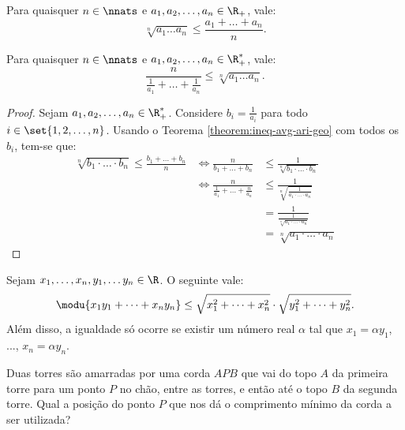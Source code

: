 \begin{theorem}
\label{theorem:ineq-avg-ari-geo}
Para quaisquer $n \in \nnats$ e $a_1, a_2, \dots , a_n \in \R_+$, vale:
%
\begin{equation*}
    \sqrt[n]{a_1\dots a_n} \leq \frac {a_1 + \dots + a_n} n.
\end{equation*}
\end{theorem}

\begin{theorem}
Para quaisquer $n \in \nnats$ e $a_1, a_2, \dots , a_n \in \R_+^*$, vale:
%
\begin{equation*}
    \frac n {\frac 1 {a_1} + \dots + \frac 1 {a_n}}  \leq \sqrt[n]{a_1\dots a_n}  .
\end{equation*}
\end{theorem}

\begin{proof}
Sejam $a_1, a_2, \dots, a_n \in \R_+ ^*$. Considere $b_i = \frac 1 {a_i}$ para todo $i \in \set{1, 2, \dots, n}$. Usando o Teorema \ref{theorem:ineq-avg-ari-geo} com todos os $b_i$, tem-se que:
%
\begin{eqnarray*}
\sqrt[n]{b_1 \cdot \dots \cdot b_n } \le \frac {b_1 + \dots + b_n } n & \iff \frac n {b_1 + \dots + b_n } & \le \frac 1 {\sqrt[n]{b_1 \cdot \dots \cdot b_n }} \\
& \iff \frac n {\frac 1 {a_1} + \dots + \frac n {a_n}} & \le \frac 1 {\sqrt[n]{\frac 1 {a_1 \cdot \dots \cdot a_n}}} \\ 
& & = \frac 1 {\frac 1 {\sqrt[n]{a_1 \cdot \dots \cdot a_n}}} \\ 
& & =  \sqrt[n]{a_1 \cdot \dots \cdot a_n}
\end{eqnarray*}
\end{proof}

\begin{theorem}
Sejam $x_1, \dots , x_n, y_1, \dots y_n \in \R$. O seguinte vale:
%
\begin{equation*}
    \modu{x_1y_1 + \dots + x_ny_n} \leq \sqrt{x^2_1+ \dots + x^2_n}
    \cdot \sqrt{y^2_1+ \dots + y^2_n}.
\end{equation*}
%
Além disso, a igualdade só ocorre se existir um número real $\alpha$ tal que $x_1 = \alpha y_1$, ..., $x_n = \alpha y_n$.
\end{theorem}

\begin{example}
Duas torres são amarradas por uma corda $APB$ que vai do topo $A$ da primeira torre para um ponto $P$ no chão, entre as torres, e então
até o topo $B$ da segunda torre. Qual a posição do ponto $P$ que nos dá o comprimento mínimo da corda a ser utilizada?
\end{example}

